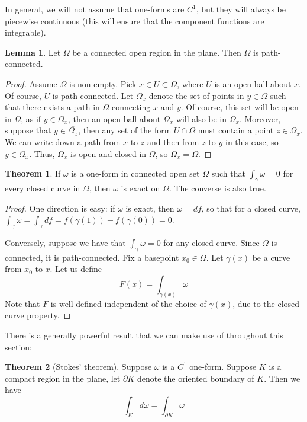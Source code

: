 \documentclass[aps,pra,showpacs,notitlepage,onecolumn,superscriptaddress,nofootinbib]{revtex4-1}
\theoremstyle{definition}
\newtheorem{lemma}{Lemma}[section]
\newtheorem{theorem}{Theorem}[section]
\begin{document}
\noindent In general, we will not assume that one-forms are $C^1$, but they will always be piecewise continuous (this will ensure that the component functions are integrable).

\begin{lemma}
  Let $\Omega$ be a connected open region in the plane. Then $\Omega$ is path-connected.
\end{lemma}
\begin{proof}
  Assume $\Omega$ is non-empty. Pick $x \in U \subset \Omega$, where $U$ is an open ball about $x$. Of course, $U$ is path connected. Let $\Omega_x$ denote the set of
  points in $y \in \Omega$ such that there exists a path in $\Omega$ connecting $x$ and $y$. Of course, this set will be open in $\Omega$, as if $y \in \Omega_x$, then an open
  ball about $\Omega_x$ will also be in $\Omega_x$. Moreover, suppose that $y \in \overline{\Omega_x}$, then any set of the form $U \cap \Omega$ must contain a point
  $z \in \Omega_x$. We can write down a path from $x$ to $z$ and then from $z$ to $y$ in this case, so $y \in \Omega_x$. Thus, $\Omega_x$ is open and closed in $\Omega$,
  so $\Omega_x = \Omega$.
  \end{proof}

\begin{theorem}
 If $\omega$ is a one-form in connected open set $\Omega$ such that $\int_{\gamma} \omega = 0$ for every closed curve in $\Omega$, then $\omega$ is exact on $\Omega$. The converse is also true.
\end{theorem}
\begin{proof}
  One direction is easy: if $\omega$ is exact, then $\omega = df$, so that for a closed curve, $\int_{\gamma} \omega = \int_{\gamma} df = f(\gamma(1)) - f(\gamma(0)) = 0$.

  Conversely, suppose we have that $\int_{\gamma} \omega = 0$ for any closed curve. Since $\Omega$ is connected, it is path-connected. Fix a basepoint $x_0 \in \Omega$. Let
  $\gamma(x)$ be a curve from $x_0$ to $x$. Let us define
  \begin{equation}
    F(x) = \displaystyle\int_{\gamma(x)} \omega
  \end{equation}
  Note that $F$ is well-defined independent of the choice of $\gamma(x)$, due to the closed curve property.
\end{proof}

\noindent There is a generally powerful result that we can make use of throughout this section:

\begin{theorem}[Stokes' theorem]
  Suppose $\omega$ is a $C^1$ one-form. Suppose $K$ is a compact region in the plane, let $\partial K$ denote the oriented boundary of $K$. Then we have
  \begin{equation}
    \displaystyle\int_{K} d\omega = \displaystyle\int_{\partial K} \omega
    \end{equation}
\end{theorem}
\end{document}
